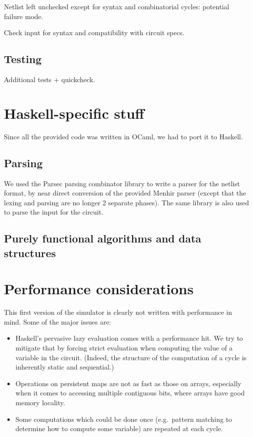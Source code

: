 \documentclass[a4paper, 11pt]{article}
\begin{document}
Netlist left unchecked except for syntax and combinatorial cycles: potential failure mode.

Check input for syntax and compatibility with circuit specs.

\subsection{Testing}

Additional tests + quickcheck.



\section{Haskell-specific stuff}

Since all the provided code was written in OCaml, we had to port it to Haskell.

\subsection{Parsing}

We used the Parsec parsing combinator library to write a parser for the netlist format, by near direct conversion of the provided Menhir parser (except that the lexing and parsing are no longer 2 separate phases). The same library is also used to parse the input for the circuit.

\subsection{Purely functional algorithms and data structures}




\section{Performance considerations}

This first version of the simulator is clearly not written with performance in mind. Some of the major issues are:
\begin{itemize}
\item Haskell's pervasive lazy evaluation comes with a performance hit. We try to mitigate that by forcing strict evaluation when computing the value of a variable in the circuit. (Indeed, the structure of the computation of a cycle is inherently static and sequential.)
\item Operations on persistent maps are not as fast as those on arrays, especially when it comes to accessing multiple contiguous bits, where arrays have good memory locality.
\item Some computations which could be done once (e.g.\ pattern matching to determine how to compute some variable) are repeated at each cycle.
\end{itemize}
\end{document}
